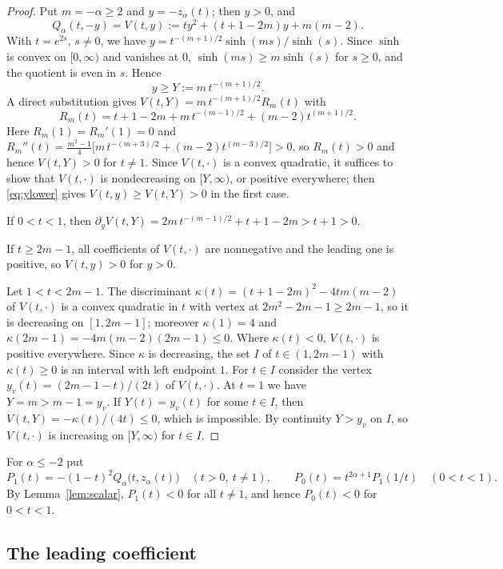 \documentclass[11pt]{amsart}
\theoremstyle{definition}
\theoremstyle{remark}
\numberwithin{equation}{section}
\begin{document}
\begin{proof}
Put $m=-\alpha\ge2$ and $y=-z_\alpha(t)$; then $y>0$, and
\[
Q_\alpha(t,-y)=V(t,y):=ty^2+(t+1-2m)y+m(m-2).
\]
With $t=e^{2s}$, $s\ne0$, we have $y=t^{-(m+1)/2}\sinh(ms)/\sinh(s)$. Since $\sinh$ is convex on $[0,\infty)$ and vanishes at $0$, $\sinh(ms)\ge m\sinh(s)$ for $s\ge0$, and the quotient is even in $s$. Hence
\begin{equation}\label{eq:ylower}
y\ge Y:=m\,t^{-(m+1)/2}.
\end{equation}
A direct substitution gives $V(t,Y)=m\,t^{-(m+1)/2}R_m(t)$ with
\[
R_m(t)=t+1-2m+m\,t^{-(m-1)/2}+(m-2)t^{(m+1)/2}.
\]
Here $R_m(1)=R_m'(1)=0$ and $R_m''(t)=\frac{m^2-1}4\bigl[m\,t^{-(m+3)/2}+(m-2)t^{(m-3)/2}\bigr]>0$, so $R_m(t)>0$ and hence $V(t,Y)>0$ for $t\ne1$. Since $V(t,\cdot)$ is a convex quadratic, it suffices to show that $V(t,\cdot)$ is nondecreasing on $[Y,\infty)$, or positive everywhere; then \eqref{eq:ylower} gives $V(t,y)\ge V(t,Y)>0$ in the first case.

If $0<t<1$, then $\partial_yV(t,Y)=2m\,t^{-(m-1)/2}+t+1-2m>t+1>0$.

If $t\ge2m-1$, all coefficients of $V(t,\cdot)$ are nonnegative and the leading one is positive, so $V(t,y)>0$ for $y>0$.

Let $1<t<2m-1$. The discriminant $\kappa(t)=(t+1-2m)^2-4tm(m-2)$ of $V(t,\cdot)$ is a convex quadratic in $t$ with vertex at $2m^2-2m-1\ge2m-1$, so it is decreasing on $[1,2m-1]$; moreover $\kappa(1)=4$ and $\kappa(2m-1)=-4m(m-2)(2m-1)\le0$. Where $\kappa(t)<0$, $V(t,\cdot)$ is positive everywhere. Since $\kappa$ is decreasing, the set $I$ of $t\in(1,2m-1)$ with $\kappa(t)\ge0$ is an interval with left endpoint $1$. For $t\in I$ consider the vertex $y_v(t)=(2m-1-t)/(2t)$ of $V(t,\cdot)$. At $t=1$ we have $Y=m>m-1=y_v$. If $Y(t)=y_v(t)$ for some $t\in I$, then $V(t,Y)=-\kappa(t)/(4t)\le0$, which is impossible. By continuity $Y>y_v$ on $I$, so $V(t,\cdot)$ is increasing on $[Y,\infty)$ for $t\in I$.
\end{proof}

For $\alpha\le-2$ put
\begin{equation}\label{eq:P0P1}
P_1(t)=-(1-t)^2Q_\alpha\bigl(t,z_\alpha(t)\bigr)\quad(t>0,\ t\ne1),\qquad P_0(t)=t^{2\alpha+1}P_1(1/t)\quad(0<t<1).
\end{equation}
By Lemma~\ref{lem:scalar}, $P_1(t)<0$ for all $t\ne1$, and hence $P_0(t)<0$ for $0<t<1$.

\subsection{The leading coefficient}
\end{document}
